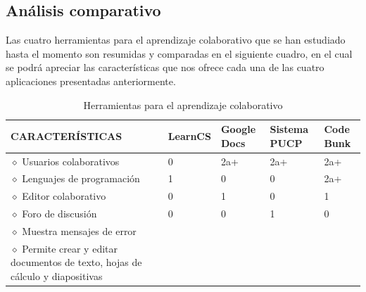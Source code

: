 \subsection{Análisis comparativo}
Las cuatro herramientas para el aprendizaje colaborativo que se han estudiado hasta el momento son resumidas y comparadas en el siguiente cuadro, en el cual se podrá apreciar las características que nos ofrece cada una de las cuatro aplicaciones presentadas anteriormente.\\
\begin{longtable}{|L{7cm}|C{1.5cm}|C{1.5cm}|C{1.5cm}|C{1.5cm}|}
\caption{Herramientas para el aprendizaje colaborativo}
\label{tab:herramientasAC}\\
    \toprule[0.8mm]
    CARACTERÍSTICAS	& LearnCS &	Google Docs & Sistema PUCP & Code Bunk\\	
    \midrule[0.6mm]
    $\diamond$ Usuarios colaborativos & 0	& 2a+ & 2a+	& 2a+	\\
    $\diamond$ Lenguajes de programación & 1	& 0 & 0	& 2a+	\\  
    $\diamond$ Editor colaborativo & 0	& 1 & 0	& 1	\\ 
    $\diamond$ Foro de discusión & 0 & 0 & 1	& 0	\\         
    \midrule[0.6mm]
    $\diamond$ Muestra mensajes de error	&\cmark	&\xmark	&\xmark	&\cmark	\\
    $\diamond$ Permite crear y editar documentos de texto, hojas de cálculo y diapositivas &\xmark	&\cmark	&\xmark	&\xmark	\\

\end{longtable}
